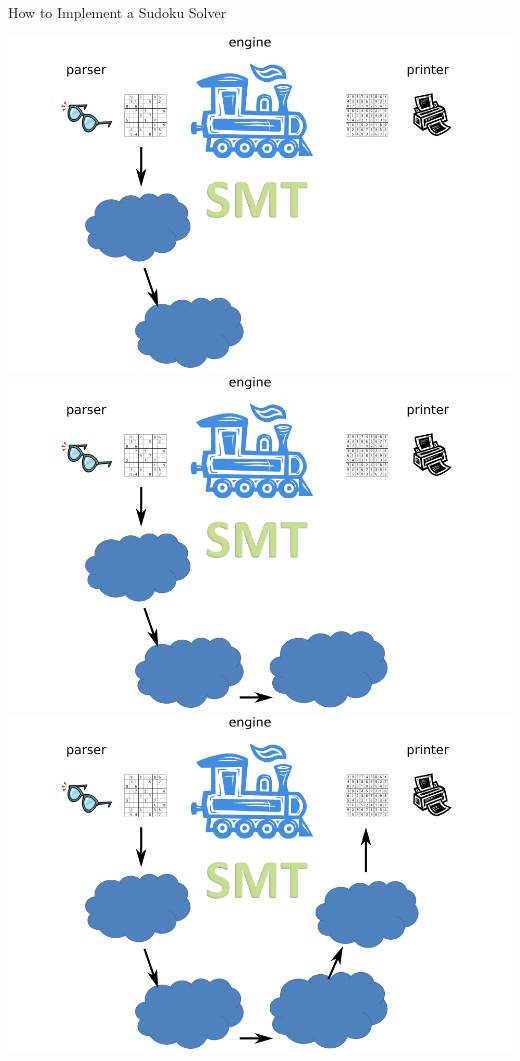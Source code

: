 \documentclass{beamer}
\begin{document}
\begin{frame}{How to Implement a Sudoku Solver}
\begin{overprint}
 \includegraphics[width=\textwidth]{current4}
 \includegraphics[width=\textwidth]{current5}
 \includegraphics[width=\textwidth]{current6}

\end{overprint}
\end{frame}
\end{document}

